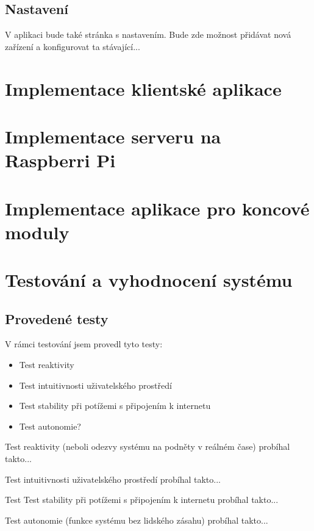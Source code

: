 \subsection*{Nastavení}
V aplikaci bude také stránka s nastavením. Bude zde možnost přidávat nová zařízení a konfigurovat ta stávající...


\section{Implementace klientské aplikace}
\section{Implementace serveru na Raspberri Pi}
\section{Implementace aplikace pro koncové moduly}
\section{Testování a vyhodnocení systému}


\subsection*{Provedené testy}
V rámci testování jsem provedl tyto testy:
\begin{itemize}
    \item Test reaktivity
    \item Test intuitivnosti uživatelského prostředí
    \item Test stability při potížemi s připojením k internetu
    \item Test autonomie?
\end{itemize}

Test reaktivity (neboli odezvy systému na podněty v reálném čase) probíhal takto...

Test intuitivnosti uživatelského prostředí probíhal takto...

Test Test stability při potížemi s připojením k internetu probíhal takto...

Test autonomie (funkce systému bez lidského zásahu) probíhal takto...

